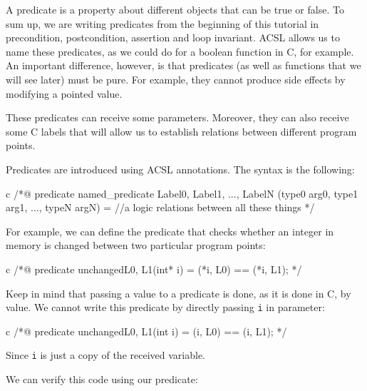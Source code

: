 A predicate is a property about different objects that can be true or
false. To sum up, we are writing predicates from the beginning of this
tutorial in precondition, postcondition, assertion and loop invariant.
ACSL allows us to name these predicates, as we could do for a boolean
function in C, for example. An important difference, however, is that
predicates (as well as functions that we will see later) must be pure.
For example, they cannot produce side effects by modifying a pointed
value.

These predicates can receive some parameters. Moreover, they can also
receive some C labels that will allow us to establish relations between
different program points.





Predicates are introduced using ACSL annotations. The syntax is the
following:



\begin{CodeBlock}{c}
/*@
  predicate named_predicate { Label0, Label1, ..., LabelN }(type0 arg0, type1 arg1, ..., typeN argN) =
    //a logic relations between all these things
*/
\end{CodeBlock}



For example, we can define the predicate that checks whether an integer
in memory is changed between two particular program points:



\begin{CodeBlock}{c}
/*@
  predicate unchanged{L0, L1}(int* i) =
    \at(*i, L0) == \at(*i, L1);
*/
\end{CodeBlock}



\begin{Warning}
  Keep in mind that passing a value to a predicate is done, as it is done in C,
  by value. We cannot write this predicate by directly passing \texttt{i} in
  parameter:

\begin{CodeBlock}{c}
/*@
  predicate unchanged{L0, L1}(int i) =
    \at(i, L0) == \at(i, L1);
 */
\end{CodeBlock}

  Since \texttt{i} is just a copy of the received variable.
\end{Warning}


We can verify this code using our predicate:



